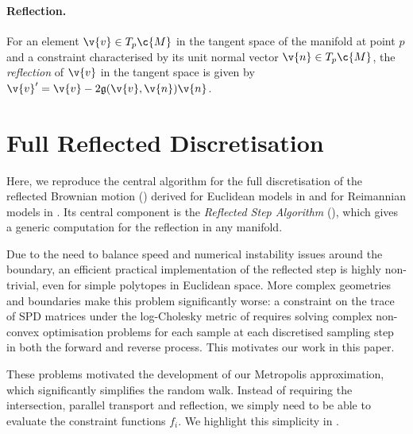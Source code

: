 \paragraph{Reflection.}
For an element \(\v{v}\in T_p\c{M}\) in the tangent space of the manifold at point $p$ and a constraint characterised by its unit normal vector \(\v{n}\in T_p\c{M}\), the \emph{reflection} of \(\v{v}\) in the tangent space is given by $\v{v}' = \v{v} - 2\mathfrak{g}(\v{v},\v{n}) \v{n}$.

\section{Full Reflected Discretisation}
\label{sec:reflected_discretisation}

Here, we reproduce the central algorithm for the full discretisation of the reflected Brownian motion () derived for Euclidean models in \cite{lou2023reflected} and for Reimannian models in \cite{fishman2023diffusion}.
Its central component is the \emph{Reflected Step Algorithm} (), which gives a generic computation for the reflection in any manifold.

Due to the need to balance speed and numerical instability issues around the boundary, an efficient practical implementation of the reflected step is highly non-trivial, even for simple polytopes in Euclidean space.
More complex geometries and boundaries make this problem significantly worse: a constraint on the trace of SPD matrices under the log-Cholesky metric of \cite{lin2019riemannian} requires solving complex non-convex optimisation problems for each sample at each discretised sampling step in both the forward and reverse process.
This motivates our work in this paper.

These problems motivated the development of our Metropolis approximation, which significantly simplifies the random walk.
Instead of requiring the intersection, parallel transport and reflection, we simply need to be able to evaluate the constraint functions $f_i$.
We highlight this simplicity in .


